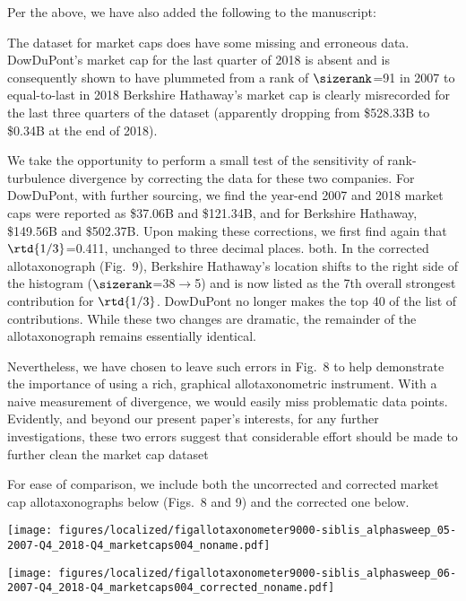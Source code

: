 Per the above, we have also added the following to the manuscript:

\begin{excerpt}
  The dataset for market caps does
  have some missing and erroneous data.
  DowDuPont's market cap for the last quarter of 2018 is absent
  and is consequently shown to have plummeted from
  a rank of
  $\sizerank$=91 in 2007
  to equal-to-last in 2018
  Berkshire Hathaway's
  market cap is clearly misrecorded
  for the last three
  quarters of the dataset
  (apparently dropping from
  \$528.33B
  to
  \$0.34B at the end of 2018).

  We take the opportunity to perform a small test of the sensitivity of rank-turbulence divergence
  by correcting the data for these two companies.
  For DowDuPont, with further sourcing, we find
  the year-end 2007 and 2018 market caps were reported as
  \$37.06B
  and
  \$121.34B,
  and for
  Berkshire Hathaway,
  \$149.56B
  and
  \$502.37B.
  Upon making these corrections, we first find again
  that $\rtd{1/3}$=0.411, unchanged to three decimal places.
  both.
  In the corrected allotaxonograph (Fig.~9),
  Berkshire Hathaway's location shifts to the right
  side of the histogram ($\sizerank$=38$\rightarrow$5)
  and is now listed as the 7th overall strongest contribution
  for $\rtd{1/3}$.
  DowDuPont no longer makes the top 40 of
  the list of contributions.
  While these two changes are dramatic,
  the remainder of the allotaxonograph
  remains essentially identical.

  Nevertheless, we have chosen to leave such errors in
  Fig.~8
  to help demonstrate the importance of using a rich,
  graphical allotaxonometric instrument.
  With a naive measurement of divergence, we would easily miss problematic data points.
  Evidently, and beyond our present paper's interests,
  for any further investigations,
  these two errors suggest that considerable effort should
  be made to further clean the market cap dataset
\end{excerpt}

\clearpage

For ease of comparison, we include both the
uncorrected and corrected market cap allotaxonographs below (Figs.~8 and 9)
and the corrected one below.

\texttt{[image: figures/localized/figallotaxonometer9000-siblis\_alphasweep\_05-2007-Q4\_2018-Q4\_marketcaps004\_noname.pdf]}

\texttt{[image: figures/localized/figallotaxonometer9000-siblis\_alphasweep\_06-2007-Q4\_2018-Q4\_marketcaps004\_corrected\_noname.pdf]}

